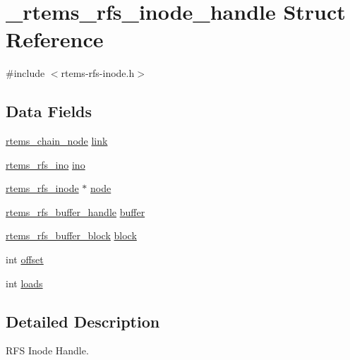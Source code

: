 \hypertarget{struct__rtems__rfs__inode__handle}{}\section{\+\_\+rtems\+\_\+rfs\+\_\+inode\+\_\+handle Struct Reference}
\label{struct__rtems__rfs__inode__handle}


{\ttfamily \#include $<$rtems-\/rfs-\/inode.\+h$>$}

\subsection*{Data Fields}
\begin{DoxyCompactItemize}
\item 
\mbox{\hyperlink{structChain__Node__struct}{rtems\+\_\+chain\+\_\+node}} \mbox{\hyperlink{struct__rtems__rfs__inode__handle_a94d55c23f49ac8031c4722b2c6123edf}{link}}
\item 
\mbox{\hyperlink{rtems-rfs-inode_8h_ae658325c3ff9941f2e68315d20e3c723}{rtems\+\_\+rfs\+\_\+ino}} \mbox{\hyperlink{struct__rtems__rfs__inode__handle_a6fe61678de151c958448620a77337174}{ino}}
\item 
\mbox{\hyperlink{rtems-rfs-inode_8h_a119b0085992c786d2f91b17a5ce11434}{rtems\+\_\+rfs\+\_\+inode}} $\ast$ \mbox{\hyperlink{struct__rtems__rfs__inode__handle_ab1fb791b619ee730f7e01c7a1c3d5cfb}{node}}
\item 
\mbox{\hyperlink{rtems-rfs-buffer_8h_a17f97c37c5273ad28d413dfd2d175e23}{rtems\+\_\+rfs\+\_\+buffer\+\_\+handle}} \mbox{\hyperlink{struct__rtems__rfs__inode__handle_a811864b191be6fef3f58f3ec688dbaa0}{buffer}}
\item 
\mbox{\hyperlink{rtems-rfs-buffer_8h_a5650d53328a5af0a78198fe780aec043}{rtems\+\_\+rfs\+\_\+buffer\+\_\+block}} \mbox{\hyperlink{struct__rtems__rfs__inode__handle_a112006fc405e50d123d20a4ea1f02850}{block}}
\item 
int \mbox{\hyperlink{struct__rtems__rfs__inode__handle_a129042145274b3959eb5f284f16b5f7b}{offset}}
\item 
int \mbox{\hyperlink{struct__rtems__rfs__inode__handle_a397ef6df93f9776c82abcfff393e2968}{loads}}
\end{DoxyCompactItemize}


\subsection{Detailed Description}
R\+FS Inode Handle. 

